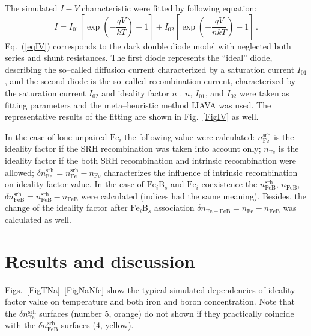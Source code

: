 \documentclass[12pt]{article}
\begin{document}
The simulated $I-V$ characteristic were fitted by following equation:
\begin{equation}
\label{eqIV}
    I=I_{01}\left[\exp\left(-\frac{qV}{kT}\right)-1\right]+ I_{02}\left[\exp\left(-\frac{qV}{nkT}\right)-1\right]\,.
\end{equation}
Eq.~(\ref{eqIV}) corresponds to the dark double diode model with neglected both series and shunt resistances.
The first diode represents the ``ideal'' diode, describing the so--called diffusion current characterized by a saturation current $I_{01}$,
and the second diode is the so--called recombination current, characterized by the saturation current $I_{02}$ and ideality factor $n$ \cite{Breitenstein2013}.
$n$, $I_{01}$, and $I_{02}$ were taken as fitting parameters and the meta--heuristic method IJAVA \cite{IJAVA} was used.
The representative results of the fitting are shown in Fig.~\ref{FigIV} as well.


In the case of lone unpaired $\mathrm{Fe}_i$ the following value were calculated:
$n_\mathrm{Fe}^\mathrm{srh}$ is the ideality factor if the SRH recombination was taken into account only;
$n_\mathrm{Fe}$ is the ideality factor if the both SRH recombination and intrinsic recombination were allowed;
$\delta n_\mathrm{Fe}^\mathrm{srh}=n_\mathrm{Fe}^\mathrm{srh}-n_\mathrm{Fe}$ characterizes the influence of intrinsic recombination on ideality factor value.
In the case of $\mathrm{Fe}_i\mathrm{B}_s$ and $\mathrm{Fe}_i$ coexistence the
$n_\mathrm{FeB}^\mathrm{srh}$, $n_\mathrm{FeB}$, $\delta n_\mathrm{FeB}^\mathrm{srh}=n_\mathrm{FeB}^\mathrm{srh}-n_\mathrm{FeB}$ were calculated (indices had the same meaning).
Besides, the change of the ideality factor after $\mathrm{Fe}_i\mathrm{B}_s$ association $\delta n_\mathrm{Fe-FeB}=n_\mathrm{Fe}-n_\mathrm{FeB}$ was calculated as well.


\section{Results and discussion}

Figs.~\ref{FigTNa}--\ref{FigNaNfe} show the typical simulated dependencies of ideality factor value on temperature and both iron and boron concentration.
Note that the $\delta n_\mathrm{Fe}^\mathrm{srh}$ surfaces (number 5, orange) do not shown if they practically coincide with
the $\delta n_\mathrm{FeB}^\mathrm{srh}$ surfaces (4, yellow).
\end{document}
